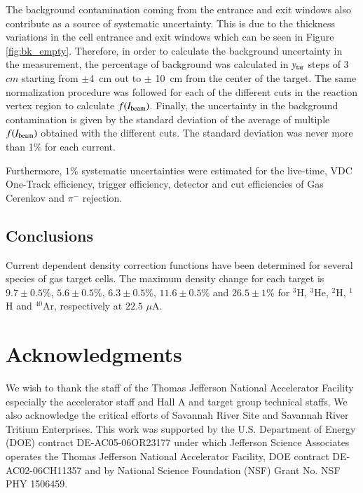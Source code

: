 \documentclass[review,numbers,sort&compress]{elsarticle}
\begin{document}
The background contamination coming from the entrance and exit windows also contribute as a source of systematic uncertainty. This is due to the thickness variations in the cell entrance and exit windows which can be seen in Figure \ref{fig:bk_empty}. Therefore, in order to calculate the background uncertainty in the measurement, the percentage of background was calculated in $y_{\rm{tar}}$ steps of $3$ $cm$ starting from $\pm$4~cm out to $\pm$ 10~cm from the center of the target.  The same normalization procedure was followed for each of the different cuts in the reaction vertex region to calculate $f(I_{\rm{beam}})$. Finally, the uncertainty in the background contamination is given by the standard deviation of the average of multiple $f(I_{\rm{beam}})$ obtained with the different cuts. The standard deviation was never more than 1$\%$ for each current.

Furthermore, $1\%$ systematic uncertainties were estimated for the live-time, VDC One-Track efficiency, 
trigger efficiency, detector and cut efficiencies of Gas Cerenkov and $\pi^{-}$ rejection.

\subsection {Conclusions }

Current dependent density correction functions have been determined for several species
of gas target cells. The maximum density change for each target is $9.7 \pm 0.5 \%$, $5.6 \pm 0.5\% $, $6.3 \pm 0.5\% $, $11.6\pm 0.5\% $ 
and $26.5 \pm 1 \%$ for $^{3}$H, $^{3}$He, $^{2}$H, $^{1}$H and $^{40}$Ar, respectively at $22.5$ $\mu$A. 

\section{Acknowledgments}

We wish to thank the staff of the Thomas Jefferson National Accelerator Facility especially 
the accelerator staff and  Hall A and target group technical staffs. 
We also acknowledge the critical efforts of Savannah River Site and
Savannah River Tritium Enterprises.
This work was supported by the U.S. Department of Energy (DOE) contract
DE-AC05-06OR23177 under which Jefferson Science Associates operates 
the Thomas Jefferson National Accelerator Facility,
DOE contract DE-AC02-06CH11357 
and by National Science Foundation (NSF) Grant No. NSF PHY 1506459.

 

\end{document}
